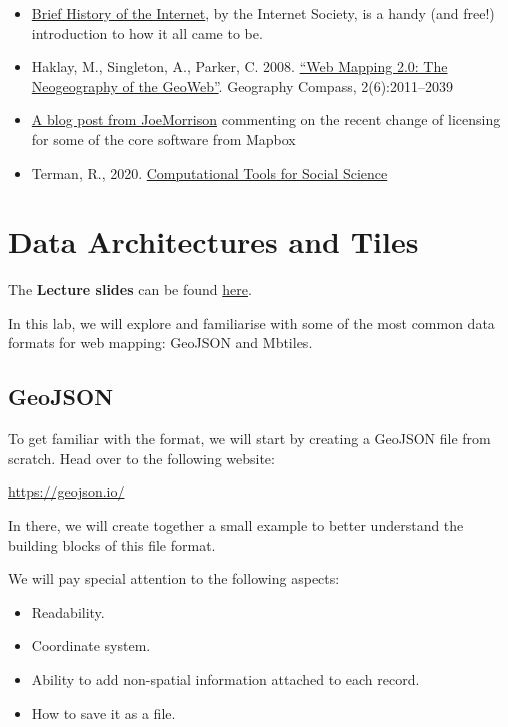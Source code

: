 \documentclass[
  letterpaper,
  DIV=11,
  numbers=noendperiod]{scrreprt}
\providecommand{\tightlist}{%
  \setlength{\itemsep}{0pt}\setlength{\parskip}{0pt}}\usepackage{longtable,booktabs,array}
\begin{document}
\begin{itemize}
\tightlist
\item
  \href{https://www.internetsociety.org/resources/doc/2017/brief-history-internet/}{Brief
  History of the Internet}, by the Internet Society, is a handy (and
  free!) introduction to how it all came to be.
\item
  Haklay, M., Singleton, A., Parker, C. 2008.
  \href{https://compass.onlinelibrary.wiley.com/doi/abs/10.1111/j.1749-8198.2008.00167.x}{``Web
  Mapping 2.0: The Neogeography of the GeoWeb''}. Geography Compass,
  2(6):2011--2039
\item
  \href{https://joemorrison.medium.com/death-of-an-open-source-business-model-62bc227a7e9b}{A
  blog post from JoeMorrison} commenting on the recent change of
  licensing for some of the core software from Mapbox
\item
  Terman, R., 2020.
  \href{https://plsc-31101.github.io/course/}{Computational Tools for
  Social Science}
\end{itemize}


\chapter{Data Architectures and
Tiles}\label{data-architectures-and-tiles}

The \textbf{Lecture slides} can be found
\href{https://github.com/GDSL-UL/wma/raw/main/lectures/w04.html}{here}.

In this lab, we will explore and familiarise with some of the most
common data formats for web mapping: GeoJSON and Mbtiles.

\section{GeoJSON}\label{geojson}

To get familiar with the format, we will start by creating a GeoJSON
file from scratch. Head over to the following website:

\url{https://geojson.io/}

In there, we will create together a small example to better understand
the building blocks of this file format.

We will pay special attention to the following aspects:

\begin{itemize}
\tightlist
\item
  Readability.
\item
  Coordinate system.
\item
  Ability to add non-spatial information attached to each record.
\item
  How to save it as a file.
\end{itemize}
\end{document}
